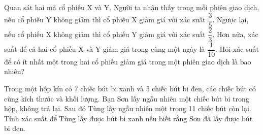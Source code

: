 \begin{bt}%
	Quan sát hai mã cổ  phiếu X và Y. Người ta nhận thấy trong mỗi phiên giao dịch, nếu cổ phiếu Y không giảm thì cổ phiếu X giảm giá với xác suất $\dfrac{3}{5}$. Ngược lại, nếu cổ phiếu X không giảm thì cổ phiếu Y giảm giá với xác suất $\dfrac{2}{3}$. Hơn nữa, xác suất để cả hai cổ phiếu X và Y giảm giá trong cùng một ngày là $\dfrac{1}{10}$. Hỏi xác suất để có ít nhất một trong hai cổ phiếu giảm giá trong một phiên giao dịch là bao nhiêu? 
\end{bt}



\begin{bt}%
	Trong một hộp kín có 7 chiếc bút bi xanh và 5 chiếc bút bi đen, các chiếc bút có cùng kích thước và khối lượng. Bạn Sơn lấy ngẫu nhiên một chiếc bút bi trong hộp, không trả lại. Sau đó Tùng lấy ngẫu nhiên một trong 11 chiếc  bút còn lại. Tính xác suất để Tùng lấy được bút bi xanh nếu biết rằng Sơn đã lấy được bút bi đen.
\end{bt}

